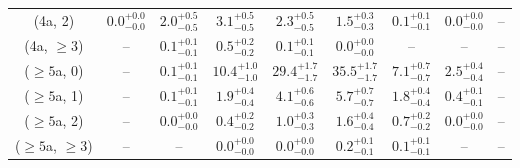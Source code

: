 \begin{table}[h!]
{\begin{tabular}{ccccccccc}
	(4a, 2) & $0.0^{+ 0.0 }_{- 0.0 }$ & $2.0^{+ 0.5 }_{- 0.5 }$ & $3.1^{+ 0.5 }_{- 0.5 }$ & $2.3^{+ 0.5 }_{- 0.5 }$ & $1.5^{+ 0.3 }_{- 0.3 }$ & $0.1^{+ 0.1 }_{- 0.1 }$ & $0.0^{+ 0.0 }_{- 0.0 }$ & -- \\[0.5ex] 
	(4a, $\ge3$) & -- & $0.1^{+ 0.1 }_{- 0.1 }$ & $0.5^{+ 0.2 }_{- 0.2 }$ & $0.1^{+ 0.1 }_{- 0.1 }$ & $0.0^{+ 0.0 }_{- 0.0 }$ & -- & -- & -- \\[0.5ex] 
	($\ge5$a, 0) & -- & $0.1^{+ 0.1 }_{- 0.1 }$ & $10.4^{+ 1.0 }_{- 1.0 }$ & $29.4^{+ 1.7 }_{- 1.7 }$ & $35.5^{+ 1.7 }_{- 1.7 }$ & $7.1^{+ 0.7 }_{- 0.7 }$ & $2.5^{+ 0.4 }_{- 0.4 }$ & -- \\[0.5ex] 
	($\ge5$a, 1) & -- & $0.1^{+ 0.1 }_{- 0.1 }$ & $1.9^{+ 0.4 }_{- 0.4 }$ & $4.1^{+ 0.6 }_{- 0.6 }$ & $5.7^{+ 0.7 }_{- 0.7 }$ & $1.8^{+ 0.4 }_{- 0.4 }$ & $0.4^{+ 0.1 }_{- 0.1 }$ & -- \\[0.5ex] 
	($\ge5$a, 2) & -- & $0.0^{+ 0.0 }_{- 0.0 }$ & $0.4^{+ 0.2 }_{- 0.2 }$ & $1.0^{+ 0.3 }_{- 0.3 }$ & $1.6^{+ 0.4 }_{- 0.4 }$ & $0.7^{+ 0.2 }_{- 0.2 }$ & $0.0^{+ 0.0 }_{- 0.0 }$ & -- \\[0.5ex] 
	($\ge5$a, $\ge3$) & -- & -- & $0.0^{+ 0.0 }_{- 0.0 }$ & $0.0^{+ 0.0 }_{- 0.0 }$ & $0.2^{+ 0.1 }_{- 0.1 }$ & $0.1^{+ 0.1 }_{- 0.1 }$ & -- & -- \\[0.5ex] 
	\hline
	\hline
\end{tabular}}
\end{table}
